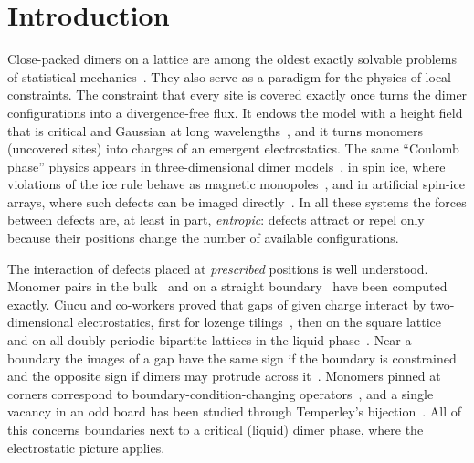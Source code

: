 \documentclass[aps,pre,twocolumn,superscriptaddress,nofootinbib,floatfix]{revtex4-2}
\begin{document}
\maketitle

\section{Introduction}

Close-packed dimers on a lattice are among the oldest exactly solvable problems of statistical mechanics~\cite{Kasteleyn1961,TemperleyFisher1961,FisherStephenson1963}. They also serve as a paradigm for the physics of local constraints. The constraint that every site is covered exactly once turns the dimer configurations into a divergence-free flux. It endows the model with a height field that is critical and Gaussian at long wavelengths~\cite{Kenyon2000,Kenyon2001,Nienhuis1984,Henley2010}, and it turns monomers (uncovered sites) into charges of an emergent electrostatics. The same ``Coulomb phase'' physics appears in three-dimensional dimer models~\cite{Huse2003}, in spin ice, where violations of the ice rule behave as magnetic monopoles~\cite{Castelnovo2008}, and in artificial spin-ice arrays, where such defects can be imaged directly~\cite{Wang2006,Ladak2010}. In all these systems the forces between defects are, at least in part, \emph{entropic}: defects attract or repel only because their positions change the number of available configurations.

The interaction of defects placed at \emph{prescribed} positions is well understood. Monomer pairs in the bulk~\cite{FisherStephenson1963,Hartwig1966,FendleyMoessnerSondhi2002,KrauthMoessner2003,WilkinsPowell2021} and on a straight boundary~\cite{PriezzhevRuelle2008} have been computed exactly. Ciucu and co-workers proved that gaps of given charge interact by two-dimensional electrostatics, first for lozenge tilings~\cite{Ciucu2010}, then on the square lattice~\cite{Ciucu2014,Ciucu2016} and on all doubly periodic bipartite lattices in the liquid phase~\cite{Ciucu2017}. Near a boundary the images of a gap have the same sign if the boundary is constrained and the opposite sign if dimers may protrude across it~\cite{CiucuKrattenthaler2011,Ciucu2015,CiucuFischer2015}. Monomers pinned at corners correspond to boundary-condition-changing operators~\cite{Allegra2015}, and a single vacancy in an odd board has been studied through Temperley's bijection~\cite{TzengWu2003,Wu2006,BouttierBowickGuitterJeng2008}. All of this concerns boundaries next to a critical (liquid) dimer phase, where the electrostatic picture applies.
\end{document}
